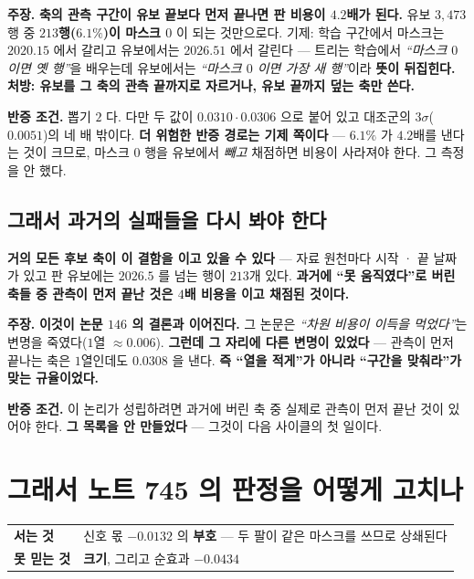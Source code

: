 \documentclass[10pt,a4paper]{article}
\newcommand{\claim}[2]{\begin{claimbox}\textbf{주장.} #1\par\smallskip
  \textcolor{gray!70}{\textbf{반증 조건.} #2}\end{claimbox}}
\begin{document}
\claim{\textbf{축의 관측 구간이 유보 끝보다 먼저 끝나면 판 비용이 $4.2$배가 된다.}
유보 $3{,}473$행 중 \textbf{$213$행($6.1\%$)이 마스크 $0$} 이 되는 것만으로다. 기제:
학습 구간에서 마스크는 $2020.15$ 에서 갈리고 유보에서는 $2026.51$ 에서 갈린다 ---
트리는 학습에서 \emph{``마스크 $0$ 이면 옛 행''}을 배우는데 유보에서는 \emph{``마스크
$0$ 이면 가장 새 행''}이라 \textbf{뜻이 뒤집힌다.} \textbf{처방: 유보를 그 축의 관측
끝까지로 자르거나, 유보 끝까지 덮는 축만 쓴다.}}
{뽑기 $2$ 다. 다만 두 값이 $0.0310 \cdot 0.0306$ 으로 붙어 있고 대조군의
$3\sigma$($0.0051$)의 네 배 밖이다. \textbf{더 위험한 반증 경로는 기제 쪽이다} ---
$6.1\%$ 가 $4.2$배를 낸다는 것이 크므로, 마스크 $0$ 행을 유보에서 \emph{빼고} 채점하면
비용이 사라져야 한다. 그 측정을 안 했다.}

\subsection*{그래서 과거의 실패들을 다시 봐야 한다}

\textbf{거의 모든 후보 축이 이 결함을 이고 있을 수 있다} --- 자료 원천마다 시작 · 끝
날짜가 있고 판 유보에는 $2026.5$ 를 넘는 행이 $213$개 있다. \textbf{과거에 ``못
움직였다''로 버린 축들 중 관측이 먼저 끝난 것은 $4$배 비용을 이고 채점된 것이다.}

\claim{\textbf{이것이 논문 $146$ 의 결론과 이어진다.} 그 논문은 \emph{``차원 비용이
이득을 먹었다''}는 변명을 죽였다($1$열 $\approx 0.006$). \textbf{그런데 그 자리에 다른
변명이 있었다} --- 관측이 먼저 끝나는 축은 $1$열인데도 $0.0308$ 을 낸다. \textbf{즉
``열을 적게''가 아니라 ``구간을 맞춰라''가 맞는 규율이었다.}}
{이 논리가 성립하려면 과거에 버린 축 중 실제로 관측이 먼저 끝난 것이 있어야 한다.
\textbf{그 목록을 안 만들었다} --- 그것이 다음 사이클의 첫 일이다.}

\section{그래서 노트 745 의 판정을 어떻게 고치나}

\begin{center}
\begin{tabular}{ll}
\toprule
\textbf{서는 것} & 신호 몫 $-0.0132$ 의 \textbf{부호} --- 두 팔이 같은 마스크를 쓰므로 상쇄된다 \\
\textbf{못 믿는 것} & \textbf{크기}, 그리고 순효과 $-0.0434$ \\
\bottomrule
\end{tabular}
\end{center}
\end{document}
